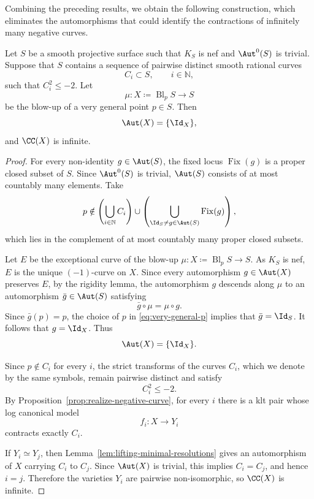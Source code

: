 \documentclass[12pt]{amsart}
\begin{document}
Combining the preceding results, we obtain the following construction,
which eliminates the automorphisms that could identify the contractions
of infinitely many negative curves.

\begin{proposition}\label{prop:very-general-blowup}
Let \(S\) be a smooth projective surface such that \(K_S\) is nef and
\(\Aut^0(S)\) is trivial. Suppose that \(S\) contains a sequence of pairwise
distinct smooth rational curves
\[
C_i\subset S,\qquad i\in\mathbb N,
\]
such that \(C_i^2\leq -2\). Let
\[
\mu\colon X\coloneqq\operatorname{Bl}_pS\longrightarrow S
\]
be the blow-up of a very general point $p\in S$. Then
\[
\Aut(X)=\{\Id_X\},
\]
and $\CC(X)$ is infinite.
\end{proposition}

\begin{proof}
For every non-identity \(g\in\Aut(S)\), the fixed locus \(\operatorname{Fix}(g)\) is a
proper closed subset of \(S\). Since \(\Aut^0(S)\) is trivial, $\Aut(S)$ consists of at most countably many elements. Take
\begin{equation}\label{eq:very-general-p}
p\notin
\left(\bigcup_{i\in\mathbb N}C_i\right)
\cup
\left(\bigcup_{\Id_S\neq g\in\Aut(S)}\operatorname{Fix}(g)\right),
\end{equation}
which lies in the complement of at most countably many proper closed subsets.

Let \(E\) be the exceptional curve of the blow-up \(\mu\colon X\coloneqq\operatorname{Bl}_pS\to S\). As \(K_S\) is nef, \(E\) is the
unique \((-1)\)-curve on \(X\). Since every automorphism \(g\in\Aut(X)\) preserves \(E\), by the rigidity lemma, the automorphism \(g\) descends along \(\mu\) to an
automorphism \(\bar g\in\Aut(S)\) satisfying
\[
\bar g\circ\mu=\mu\circ g.
\]
Since \(\bar g(p)=p\), the choice of \(p\) in
\eqref{eq:very-general-p} implies that \(\bar g=\Id_S\). It follows that
\(g=\Id_X\). Thus
\[
\Aut(X)=\{\Id_X\}.
\]

Since \(p\notin C_i\) for every \(i\), the strict transforms of the curves
\(C_i\), which we denote by the same symbols, remain pairwise distinct and
satisfy
\[
C_i^2\leq-2.
\]
By Proposition~\ref{prop:realize-negative-curve}, for every \(i\) there is a klt pair
whose log canonical model
\[
f_i\colon X\longrightarrow Y_i
\]
contracts exactly \(C_i\).

If \(Y_i\simeq Y_j\), then Lemma~\ref{lem:lifting-minimal-resolutions} gives an
automorphism of \(X\) carrying \(C_i\) to \(C_j\). Since \(\Aut(X)\) is
trivial, this implies \(C_i=C_j\), and hence \(i=j\). Therefore the varieties
\(Y_i\) are pairwise non-isomorphic, so \(\CC(X)\) is infinite.
\end{proof}
\end{document}
